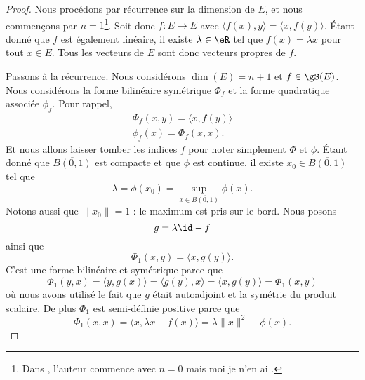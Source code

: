 \begin{proof}
    Nous procédons par récurrence sur la dimension de \( E\), et nous commençons par \( n=1\)\footnote{Dans \cite{KXjFWKA}, l'auteur commence avec \( n=0\) mais moi je n'en ai .}. Soit donc \( f\colon E\to E\) avec \( \langle f(x), y\rangle =\langle x, f(y)\rangle \). Étant donné que \( f\) est également linéaire, il existe \( \lambda\in \eR\) tel que \( f(x)=\lambda x\) pour tout \( x\in E\). Tous les vecteurs de \( E\) sont donc vecteurs propres de \( f\).

    Passons à la récurrence. Nous considérons \( \dim(E)=n+1\) et \( f\in\gS(E)\). Nous considérons la forme bilinéaire symétrique \( \Phi_f\) et la forme quadratique associée \( \phi_f\). Pour rappel,
    \begin{subequations}
        \begin{align}
        \Phi_f(x,y)=\langle x, f(y)\rangle \\
        \phi_f(x)=\Phi_f(x,x).
        \end{align}
    \end{subequations}
    Et nous allons laisser tomber les indices \( f\) pour noter simplement \( \Phi\) et \( \phi\). Étant donné que \( \overline{ B(0,1) }\) est compacte et que \( \phi\) est continue, il existe \( x_0\in\overline{ B(0,1) }\) tel que
    \begin{equation}
        \lambda=\phi(x_0)=\sup_{x\in\overline{ B(0,1) }}\phi(x).
    \end{equation}
    Notons aussi que \( \| x_0 \|=1\) : le maximum est pris sur le bord. Nous posons
    \begin{equation}
        g=\lambda\id-f
    \end{equation}
    ainsi que
    \begin{equation}
        \Phi_1(x,y)=\langle x, g(y)\rangle .
    \end{equation}
    C'est une forme bilinéaire et symétrique parce que
    \begin{equation}
        \Phi_1(y,x)=\langle y, g(x)\rangle =\langle g(y), x\rangle =\langle x, g(y)\rangle =\Phi_1(x,y)
    \end{equation}
    où nous avons utilisé le fait que \( g\) était autoadjoint et la symétrie du produit scalaire. De plus \( \Phi_1\) est semi-définie positive parce que
    \begin{equation}
        \Phi_1(x,x)=\langle x, \lambda x-f(x)\rangle =\lambda\| x \|^2-\phi(x).
    \end{equation}

\end{proof}
